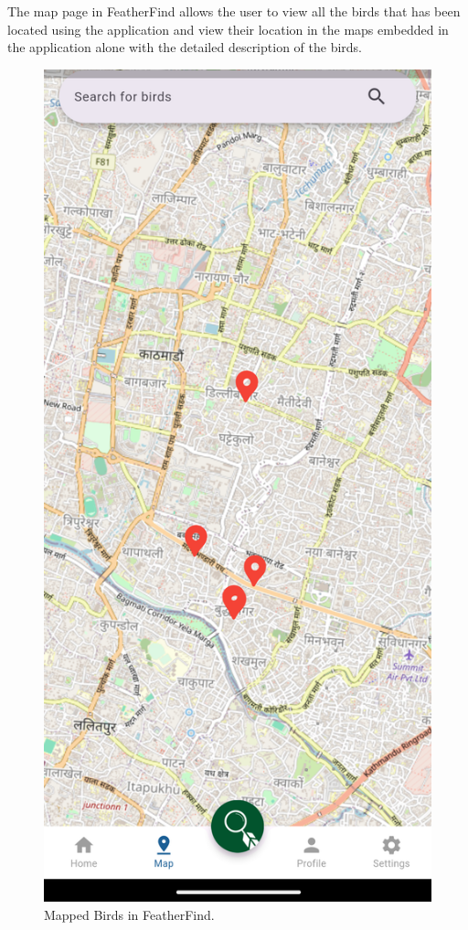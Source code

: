 The map page in FeatherFind allows the user to view all the birds that has been located
using the application and view their location in the maps embedded in the application alone 
with the detailed description of the birds.
\begin{figure}[h!]
    \centering
    \includegraphics[scale=0.18]{images/mappage.png}
    \caption{Mapped Birds in FeatherFind.}
\end{figure}


